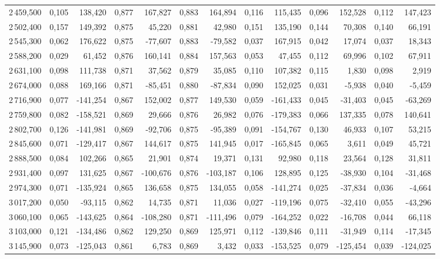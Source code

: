 \begin{longtable}{rrrrrrrrrrrrr}
2\,459,500 & 0,105 & 138,420 & 0,877 & 167,827 & 0,883 & 164,894 & 0,116 & 115,435 & 0,096 & 152,528 & 0,112 & 147,423\\
2\,502,400 & 0,157 & 149,392 & 0,875 & 45,220 & 0,881 & 42,980 & 0,151 & 135,190 & 0,144 & 70,308 & 0,140 & 66,191\\
2\,545,300 & 0,062 & 176,622 & 0,875 & -77,607 & 0,883 & -79,582 & 0,037 & 167,915 & 0,042 & 17,074 & 0,037 & 18,343\\
2\,588,200 & 0,029 & 61,452 & 0,876 & 160,141 & 0,884 & 157,563 & 0,053 & 47,455 & 0,112 & 69,996 & 0,102 & 67,911\\
2\,631,100 & 0,098 & 111,738 & 0,871 & 37,562 & 0,879 & 35,085 & 0,110 & 107,382 & 0,115 & 1,830 & 0,098 & 2,919\\
2\,674,000 & 0,088 & 169,166 & 0,871 & -85,451 & 0,880 & -87,834 & 0,090 & 152,025 & 0,031 & -5,938 & 0,040 & -5,459\\
2\,716,900 & 0,077 & -141,254 & 0,867 & 152,002 & 0,877 & 149,530 & 0,059 & -161,433 & 0,045 & -31,403 & 0,045 & -63,269\\
2\,759,800 & 0,082 & -158,521 & 0,869 & 29,666 & 0,876 & 26,982 & 0,076 & -179,383 & 0,066 & 137,335 & 0,078 & 140,641\\
2\,802,700 & 0,126 & -141,981 & 0,869 & -92,706 & 0,875 & -95,389 & 0,091 & -154,767 & 0,130 & 46,933 & 0,107 & 53,215\\
2\,845,600 & 0,071 & -129,417 & 0,867 & 144,617 & 0,875 & 141,945 & 0,017 & -165,845 & 0,065 & 3,611 & 0,049 & 45,721\\
2\,888,500 & 0,084 & 102,266 & 0,865 & 21,901 & 0,874 & 19,371 & 0,131 & 92,980 & 0,118 & 23,564 & 0,128 & 31,811\\
2\,931,400 & 0,097 & 131,625 & 0,867 & -100,676 & 0,876 & -103,187 & 0,106 & 128,895 & 0,125 & -38,930 & 0,104 & -31,468\\
2\,974,300 & 0,071 & -135,924 & 0,865 & 136,658 & 0,875 & 134,055 & 0,058 & -141,274 & 0,025 & -37,834 & 0,036 & -4,664\\
3\,017,200 & 0,050 & -93,115 & 0,862 & 14,735 & 0,871 & 11,036 & 0,027 & -119,196 & 0,075 & -32,410 & 0,055 & -43,296\\
3\,060,100 & 0,065 & -143,625 & 0,864 & -108,280 & 0,871 & -111,496 & 0,079 & -164,252 & 0,022 & -16,708 & 0,044 & 66,118\\
3\,103,000 & 0,121 & -134,486 & 0,862 & 129,250 & 0,869 & 125,971 & 0,112 & -139,846 & 0,111 & -31,949 & 0,114 & -17,345\\
3\,145,900 & 0,073 & -125,043 & 0,861 & 6,783 & 0,869 & 3,432 & 0,033 & -153,525 & 0,079 & -125,454 & 0,039 & -124,025\\

\end{longtable}
